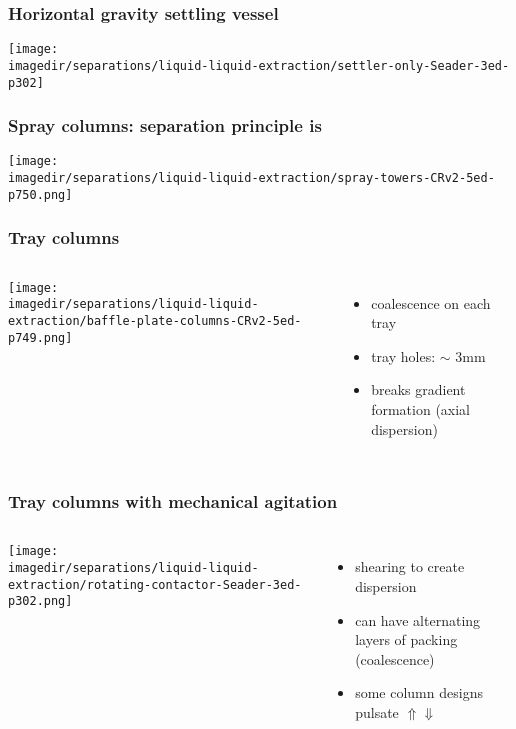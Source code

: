 \begin{frame}\frametitle{Horizontal gravity settling vessel}
	\begin{center}
		\texttt{[image: \\imagedir/separations/liquid-liquid-extraction/settler-only-Seader-3ed-p302]}
	\end{center}
\end{frame}

\begin{frame}\frametitle{Spray columns: separation principle is {\color{myRed}{gravity}}}
	\begin{center}
		\texttt{[image: \\imagedir/separations/liquid-liquid-extraction/spray-towers-CRv2-5ed-p750.png]}
	\end{center}
	\vspace{-14pt}
\end{frame}

\begin{frame}\frametitle{Tray columns}
	\begin{columns}[t]
			\vspace{-0.5cm}
			\begin{center}
				\texttt{[image: \\imagedir/separations/liquid-liquid-extraction/baffle-plate-columns-CRv2-5ed-p749.png]}
			\end{center}
			\vspace{-20pt}
			\begin{itemize}
				\item	coalescence on each tray
				\item	tray holes: $\sim$ 3mm
				\item	breaks gradient formation (axial dispersion)
			\end{itemize}
	\end{columns}
\end{frame}

\begin{frame}\frametitle{Tray columns with mechanical agitation}
	\begin{columns}[t]
			\begin{center}
				\texttt{[image: \\imagedir/separations/liquid-liquid-extraction/rotating-contactor-Seader-3ed-p302.png]}
			\end{center}
			
			\begin{itemize}
				\item	shearing to create dispersion
				\item	can have alternating layers of packing (coalescence)
				\item	some column designs pulsate $\Uparrow \Downarrow$
			\end{itemize}
	\end{columns}
\end{frame}

